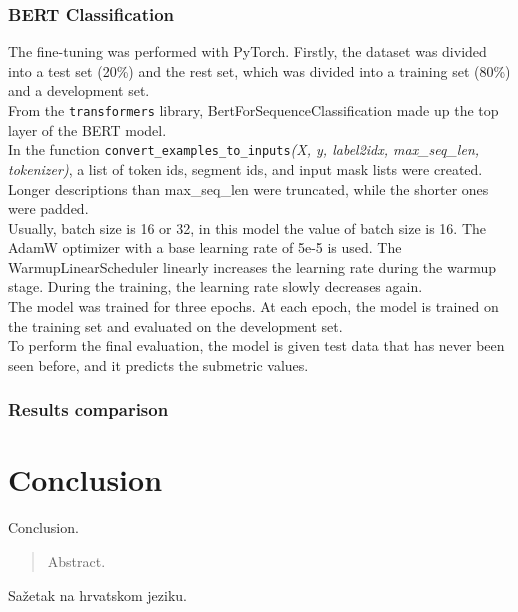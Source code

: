 \documentclass[times, utf8, zavrsni, english]{fer}
\begin{document}
\subsection{BERT Classification}
The fine-tuning was performed with PyTorch.
Firstly, the dataset was divided into a test set (20\%) and the rest set, which was divided into a training set (80\%) and a development set.\\
From the \texttt{transformers} library, BertForSequenceClassification made up the top layer of the BERT model.\\
In the function \texttt{convert\_examples\_to\_inputs}\textit{(X, y, label2idx, max\_seq\_len, tokenizer)}, a list of token ids, segment ids, and input mask lists were created. Longer descriptions than max\_seq\_len were truncated, while the shorter ones were padded. \\
Usually, batch size is 16 or 32, in this model the value of batch size is 16.
The AdamW optimizer with a base learning rate of 5e-5  is used. The WarmupLinearScheduler linearly increases the learning rate during the warmup stage. During the training, the learning rate slowly decreases again.\\
The model was trained for three epochs.
At each epoch, the model is trained on the training set and evaluated on the development set. \\
To perform the final evaluation, the model is given test data that has never been seen before, and it predicts the submetric values.

\subsection{Results comparison}

\chapter{Conclusion}
Conclusion.





\listoffigures
\begin{abstract}
Abstract.

\end{abstract}

\begin{sazetak}
Sažetak na hrvatskom jeziku.

\end{sazetak}
\end{document}
